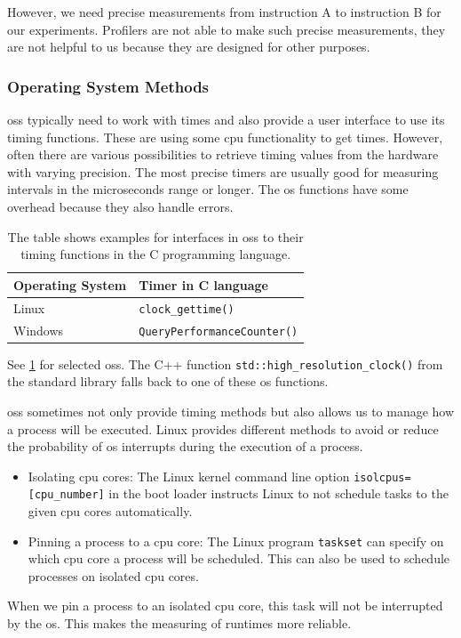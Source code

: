 However, we need precise measurements from instruction A to instruction B for our experiments.
Profilers are not able to make such precise measurements, \ie they are not helpful to us because they are designed for other purposes.

\subsubsection{Operating System Methods}
\tobechecked
\acp{os} typically need to work with times and also provide a user interface to use its timing functions.
These are using some \ac{cpu} functionality to get times.
However, often there are various possibilities to retrieve timing values from the hardware with varying precision.
The most precise timers are usually good for measuring intervals in the microseconds range or longer.
The \ac{os} functions have some overhead because they also handle errors.
\begin{table}
    \centering
    \begin{tabular}{@{}ll@{}}
        \toprule
        Operating System & Timer in C language \\
        \midrule
        Linux & \lstinline|clock_gettime()| \\
        Windows & \lstinline|QueryPerformanceCounter()| \\
        \bottomrule
    \end{tabular}
    \caption[Operating System interfaces to their timing functions]
    {
        The table shows examples for interfaces in \acp{os} to their timing functions in the C programming language.
    }
    \label{tab:approach:timing_functions}
\end{table}
See \cref{tab:approach:timing_functions} for selected \acp{os}.
The C++ function \lstinline|std::high_resolution_clock()| from the standard library falls back to one of these \ac{os} functions.

\acp{os} sometimes not only provide timing methods but also allows us to manage how a process will be executed.
Linux provides different methods to avoid or reduce the probability of \ac{os} interrupts during the execution of a process.
\begin{itemize}
    \item Isolating \ac{cpu} cores: 
    The Linux kernel command line option \lstinline|isolcpus=[cpu_number]| in the boot loader instructs Linux to not schedule tasks to the given \ac{cpu} cores automatically.
    \item Pinning a process to a \ac{cpu} core: 
    The Linux program \lstinline|taskset| can specify on which \ac{cpu} core a process will be scheduled.
    This can also be used to schedule processes on isolated \ac{cpu} cores.
\end{itemize}
When we pin a process to an isolated \ac{cpu} core, this task will not be interrupted by the \ac{os}.
This makes the measuring of runtimes more reliable.

